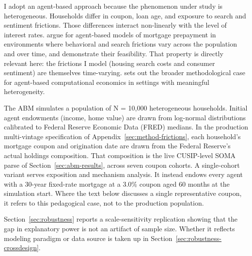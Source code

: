 \documentclass[12pt]{article}
\begin{document}
I adopt an agent-based approach because the phenomenon under study is heterogeneous. Households differ in coupon, loan age, and exposure to search and sentiment frictions. Those differences interact non-linearly with the level of interest rates. \citet{geanakoplos2012} argue for agent-based models of mortgage prepayment in environments where behavioral and search frictions vary across the population and over time, and demonstrate their feasibility. That property is directly relevant here: the frictions I model (housing search costs and consumer sentiment) are themselves time-varying. \citet{tesfatsion2006} sets out the broader methodological case for agent-based computational economics in settings with meaningful heterogeneity.

The ABM simulates a population of N = 10,000 heterogeneous households. Initial agent endowments (income, home value) are drawn from log-normal distributions calibrated to Federal Reserve Economic Data (FRED) medians. In the production multi-vintage specification of Appendix~\ref{sec:method-frictions}, each household's mortgage coupon and origination date are drawn from the Federal Reserve's actual holdings composition. That composition is the live CUSIP-level SOMA parse of Section~\ref{sec:abm-results}, across seven coupon cohorts. A single-cohort variant serves exposition and mechanism analysis. It instead endows every agent with a 30-year fixed-rate mortgage at a 3.0\% coupon aged 60 months at the simulation start. Where the text below discusses a single representative coupon, it refers to this pedagogical case, not to the production population.

Section~\ref{sec:robustness} reports a scale-sensitivity replication showing that the gap in explanatory power is not an artifact of sample size. Whether it reflects modeling paradigm or data source is taken up in Section~\ref{sec:robustness-crossdesign}.
\end{document}
